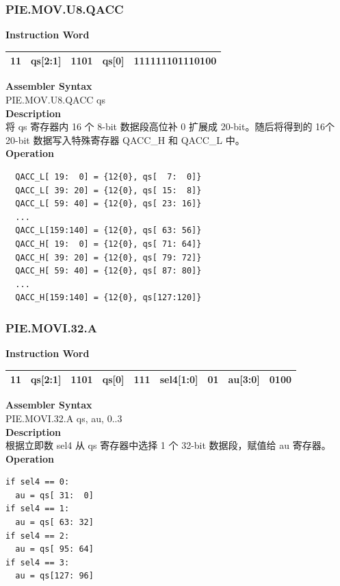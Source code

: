 \newpage
\subsubsection{PIE.MOV.U8.QACC}\label{instruction:PIEMOVU8QACC}
\setlength\tabcolsep{6pt}
\textbf{Instruction Word} \\
\begin{tabular}{|c|c|c|c|c|}
	\hline
	11 & qs[2:1] & 1101 & qs[0] & 111111101110100 \\
	\hline
\end{tabular}

\textbf{Assembler Syntax} \\
PIE.MOV.U8.QACC qs \\
\textbf{Description} \\
将 qs 寄存器内 16 个 8-bit 数据段高位补 0 扩展成 20-bit。随后将得到的 16个 20-bit 数据写入特殊寄存器 QACC\_H 和 QACC\_L 中。\\
\textbf{Operation}
\begin{lstlisting}
  QACC_L[ 19:  0] = {12{0}, qs[  7:  0]}
  QACC_L[ 39: 20] = {12{0}, qs[ 15:  8]}
  QACC_L[ 59: 40] = {12{0}, qs[ 23: 16]}
  ...
  QACC_L[159:140] = {12{0}, qs[ 63: 56]}
  QACC_H[ 19:  0] = {12{0}, qs[ 71: 64]}
  QACC_H[ 39: 20] = {12{0}, qs[ 79: 72]}
  QACC_H[ 59: 40] = {12{0}, qs[ 87: 80]}
  ...
  QACC_H[159:140] = {12{0}, qs[127:120]}
\end{lstlisting}

\newpage
\subsubsection{PIE.MOVI.32.A}\label{instruction:PIEMOVI32A}
\setlength\tabcolsep{6pt}
\textbf{Instruction Word} \\
\begin{tabular}{|c|c|c|c|c|c|c|c|c|}
	\hline
	11 & qs[2:1] & 1101 & qs[0] & 111 & sel4[1:0] & 01 & au[3:0] & 0100 \\
	\hline
\end{tabular}

\textbf{Assembler Syntax} \\
PIE.MOVI.32.A qs, au, 0..3 \\
\textbf{Description} \\
根据立即数 sel4 从 qs 寄存器中选择 1 个 32-bit 数据段，赋值给 au 寄存器。\\
\textbf{Operation}
\begin{lstlisting}
if sel4 == 0:
  au = qs[ 31:  0]
if sel4 == 1:
  au = qs[ 63: 32]
if sel4 == 2:
  au = qs[ 95: 64]
if sel4 == 3:
  au = qs[127: 96]
\end{lstlisting}

